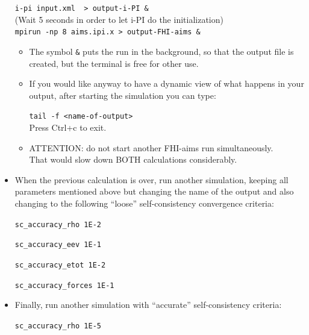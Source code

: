 \documentclass[a4paper,11pt]{scrartcl}
\def\IPI{i-pi input.xml}
\begin{document}
\begin{itemize}
{{\begin{minipage}[r]{0.95\textwidth}
\begin{center}
\vspace{0.3cm}
\texttt{\IPI \, >  output-i-PI \&}\\
\vspace{0.3cm}
(Wait 5 seconds in order to let i-PI do the initialization)\\
\vspace{0.3cm}
\texttt{mpirun -np 8  aims.ipi.x > output-FHI-aims \&}

\begin{itemize}
\item The symbol \texttt{\&} puts the run in the background, so that the output file is created, but the terminal is free for other use.
\item If you would like anyway to have a dynamic view of what happens in your output, after starting the simulation you can type:

\texttt{tail -f <name-of-output>} \\
Press Ctrl+c to exit.

\item ATTENTION: do not start another FHI-aims run simultaneously. \\That would slow down BOTH calculations considerably.
\end{itemize}
\vspace{0.3cm}
\end{center}
\end{minipage}}}

\vspace{0.3cm}

\item When the previous calculation is over, run another simulation, keeping all parameters
mentioned above but changing the name of the output and also changing
to the following ``loose'' self-consistency convergence criteria:

\begin{center}

\texttt{sc\_accuracy\_rho  1E-2}

\texttt{sc\_accuracy\_eev  1E-1}

\texttt{sc\_accuracy\_etot 1E-2}

\texttt{sc\_accuracy\_forces 1E-1}
\end{center}

\item Finally, run another simulation with ``accurate'' self-consistency criteria:

\begin{center}
\texttt{sc\_accuracy\_rho  1E-5}


\end{center}
\end{itemize}
\end{document}

